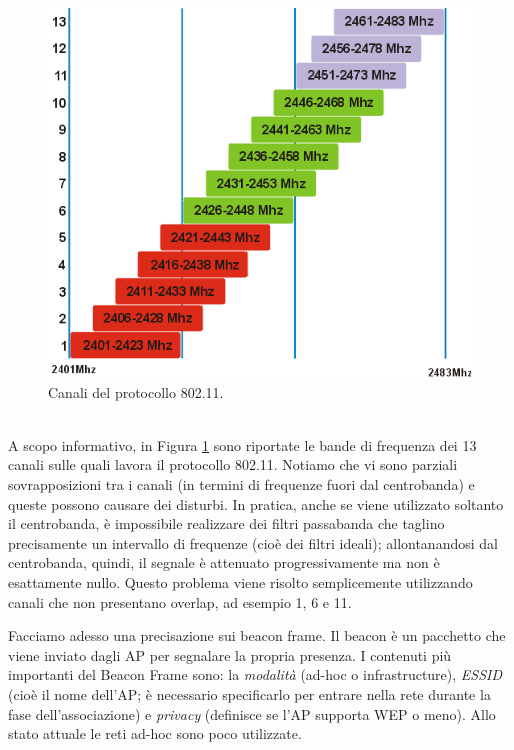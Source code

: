 \begin{figure}[htbp]
	\centering
	\includegraphics[scale = 0.4]{images/802_11-channels}
	\caption{Canali del protocollo 802.11.}
	\label{img:802_11-channels}
\end{figure}\\
A scopo informativo, in Figura \ref{img:802_11-channels} sono riportate le bande di frequenza dei 13 canali sulle quali lavora il protocollo 802.11. Notiamo che vi sono parziali sovrapposizioni tra i canali (in termini di frequenze fuori dal centrobanda) e queste possono causare dei disturbi. In pratica, anche se viene utilizzato soltanto il centrobanda, è impossibile realizzare dei filtri passabanda che taglino precisamente un intervallo di frequenze (cioè dei filtri ideali); allontanandosi dal centrobanda, quindi, il segnale è attenuato progressivamente ma non è esattamente nullo. Questo problema viene risolto semplicemente utilizzando canali che non presentano overlap, ad esempio 1, 6 e 11.

Facciamo adesso una precisazione sui beacon frame. Il beacon è un pacchetto che viene inviato dagli AP per segnalare la propria presenza. I contenuti più importanti del Beacon Frame sono: la \textit{modalità} (ad-hoc o infrastructure), \textit{ESSID} (cioè il nome dell'AP; è necessario specificarlo per entrare nella rete durante la fase dell'associazione) e \textit{privacy} (definisce se l'AP supporta WEP o meno). Allo stato attuale le reti ad-hoc sono poco utilizzate.

